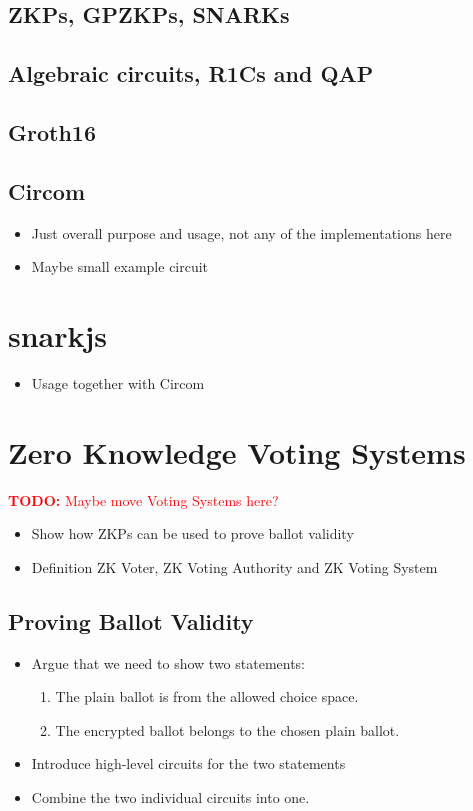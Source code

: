\documentclass{article}
\newcommand{\todo}[1]{\textcolor{red}{\textbf{TODO:} #1}}
\begin{document}
\subsection{ZKPs, GPZKPs, SNARKs}
\subsection{Algebraic circuits, R1Cs and QAP}
\subsection{Groth16}
\subsection{Circom}
\begin{itemize}
    \item Just overall purpose and usage, not any of the implementations here
    \item Maybe small example circuit
\end{itemize}

\section{snarkjs}
\begin{itemize}
    \item Usage together with Circom
\end{itemize}

\section{Zero Knowledge Voting Systems}
\todo{Maybe move Voting Systems here?}
\begin{itemize}
    \item Show how ZKPs can be used to prove ballot validity
    \item Definition ZK Voter, ZK Voting Authority and ZK Voting System
\end{itemize}
\subsection{Proving Ballot Validity}
\begin{itemize}
    \item Argue that we need to show two statements:
    \begin{enumerate}
        \item The plain ballot is from the allowed choice space.
        \item The encrypted ballot belongs to the chosen plain ballot.
    \end{enumerate}
    \item Introduce high-level circuits for the two statements
    \item Combine the two individual circuits into one.
\end{itemize}
\end{document}
